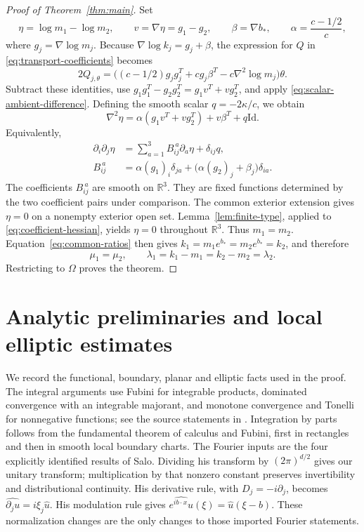 \documentclass[11pt]{article}
\newcommand{\R}{\mathbb R}
\newcommand{\Id}{\mathrm{Id}}
\theoremstyle{remark}
\numberwithin{equation}{section}
\begin{document}
\begin{proof}[Proof of Theorem~\ref{thm:main}]
Set
\[
 \eta=\log m_1-\log m_2,\qquad v=\nabla\eta=g_1-g_2,
 \qquad \beta=\nabla b_*,\qquad \alpha=\frac{c-1/2}{c},
\]
where $g_j=\nabla\log m_j$.  Because
$\nabla\log k_j=g_j+\beta$, the expression for $Q$ in
\eqref{eq:transport-coefficients} becomes
\[
 2Q_{j,\theta}
   =\bigl((c-1/2)g_jg_j^T+c g_j\beta^T
                 -c\nabla^2\log m_j\bigr)\theta.
\]
Subtract these identities, use
$g_1g_1^T-g_2g_2^T=g_1v^T+vg_2^T$, and apply
\eqref{eq:scalar-ambient-difference}.  Defining the smooth scalar
$q=-2\kappa/c$, we obtain
\[
 \nabla^2\eta
    =\alpha(g_1v^T+vg_2^T)+v\beta^T+q\Id.
\]
Equivalently,
\begin{equation}\label{eq:coefficient-hessian}
 \begin{aligned}
 \partial_i\partial_j\eta
   &=\sum_{a=1}^3 B_{ij}^{\ a}\partial_a\eta+\delta_{ij}q,\\
 B_{ij}^{\ a}
   &=\alpha(g_1)_i\delta_{ja}
        +\bigl(\alpha(g_2)_j+\beta_j\bigr)\delta_{ia}.
 \end{aligned}
\end{equation}
The coefficients $B_{ij}^{\ a}$ are smooth on $\R^3$.  They are fixed
functions determined by the two coefficient pairs under comparison.
The common exterior extension gives $\eta=0$ on a nonempty exterior open
set.  Lemma~\ref{lem:finite-type}, applied to
\eqref{eq:coefficient-hessian}, yields $\eta=0$ throughout $\R^3$.
Thus $m_1=m_2$.  Equation~\eqref{eq:common-ratios} then gives
$k_1=m_1e^{b_*}=m_2e^{b_*}=k_2$, and therefore
\[
 \mu_1=\mu_2,\qquad
 \lambda_1=k_1-m_1=k_2-m_2=\lambda_2.
\]
Restricting to $\Omega$ proves the theorem.
\end{proof}
\appendix
\section{Analytic preliminaries and local elliptic estimates}
\label{app:background}

We record the functional, boundary, planar and elliptic facts used in
the proof. The integral arguments use Fubini for integrable products,
dominated convergence with an integrable majorant, and monotone convergence
and Tonelli for nonnegative functions; see the source statements in
\cite{MeasureBackground}. Integration by parts follows from the fundamental
theorem of calculus and Fubini, first in rectangles and then in smooth local
boundary charts.
The
Fourier inputs are the four explicitly identified results of Salo. Dividing
his transform by $(2\pi)^{d/2}$ gives our unitary transform; multiplication
by that nonzero constant preserves invertibility and distributional
continuity. His derivative rule, with $D_j=-i\partial_j$, becomes
$\widehat{\partial_j u}=i\xi_j\widehat u$. His modulation rule gives
$\widehat{e^{i b\cdot x}u}(\xi)=\widehat u(\xi-b)$. These normalization
changes are the only changes to those imported Fourier statements.
\end{document}
